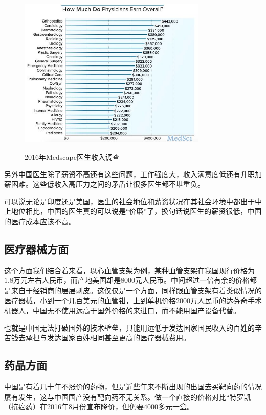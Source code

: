 \documentclass[11pt,twoside,a4paper]{article}
\begin{document}
		\begin{figure}[htb]
			\centering
			\includegraphics[width=0.8\textwidth]{graph/20160402203312581.png}\\
			\caption{2016年Medscape医生收入调查}
		\end{figure}
		
		另外中国医生除了薪资不高还有这些问题，工作强度大，收入满意度低还有升职加薪困难。这些低收入高压力之间的矛盾让很多医生都不堪重负。
		
		可以说无论是印度还是美国，医生的社会地位和薪资状况在其社会环境中都出于中上地位相比，中国的医生真的可以说是“价廉”了，换句话说医生的薪资很低，中国的医疗成本应该不高。
		
		\subsection{医疗器械方面}
		这个方面我们结合着来看，以心血管支架为例，某种血管支架在我国现行价格为$1.8$万元左右人民币，而产地美国却是$8000$元人民币。中间超过一倍有余的价格都是来自于经销商的层层剥皮。这仅仅是一个方面，同样跟血管支架有着类似情况的医疗器械，小到一个几百美元的血管钳，上到单机价格$2000$万人民币的达芬奇手术机器人，中国无不使用远高于国外价格的来进口，而不能用国产设备代替。
		
		也就是中国无法打破国外的技术壁垒，只能用远低于发达国家国民收入的百姓的辛苦钱去承担与发达国家百姓相同甚至更高的医疗器械费用。
		
		\subsection{药品方面}
		中国是有着几十年不涨价的药物，但是近些年来不断出现的出国去买靶向药的情况屡有发生，这与中国国产没有靶向药不无关系。做一个直接的价格对比“特罗凯（抗癌药）在2016年8月份宣布降价，但仍要$4000$多元一盒。
		
\end{document}
